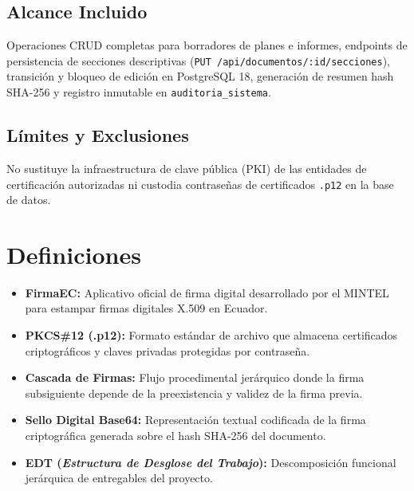 \documentclass[12pt,a4paper]{article}
\begin{document}
\subsection{Alcance Incluido}
Operaciones CRUD completas para borradores de planes e informes, endpoints de persistencia de secciones descriptivas (\texttt{PUT /api/documentos/:id/secciones}), transición y bloqueo de edición en PostgreSQL 18, generación de resumen hash SHA-256 y registro inmutable en \texttt{auditoria\_sistema}.

\subsection{Límites y Exclusiones}
No sustituye la infraestructura de clave pública (PKI) de las entidades de certificación autorizadas ni custodia contraseñas de certificados \texttt{.p12} en la base de datos.

\section{Definiciones}
\begin{itemize}[leftmargin=1.5em, itemsep=2pt, topsep=2pt]
    \item \textbf{FirmaEC:} Aplicativo oficial de firma digital desarrollado por el MINTEL para estampar firmas digitales X.509 en Ecuador.
    \item \textbf{PKCS\#12 (.p12):} Formato estándar de archivo que almacena certificados criptográficos y claves privadas protegidas por contraseña.
    \item \textbf{Cascada de Firmas:} Flujo procedimental jerárquico donde la firma subsiguiente depende de la preexistencia y validez de la firma previa.
    \item \textbf{Sello Digital Base64:} Representación textual codificada de la firma criptográfica generada sobre el hash SHA-256 del documento.
    \item \textbf{EDT (\textit{Estructura de Desglose del Trabajo}):} Descomposición funcional jerárquica de entregables del proyecto.
\end{itemize}

\end{document}
